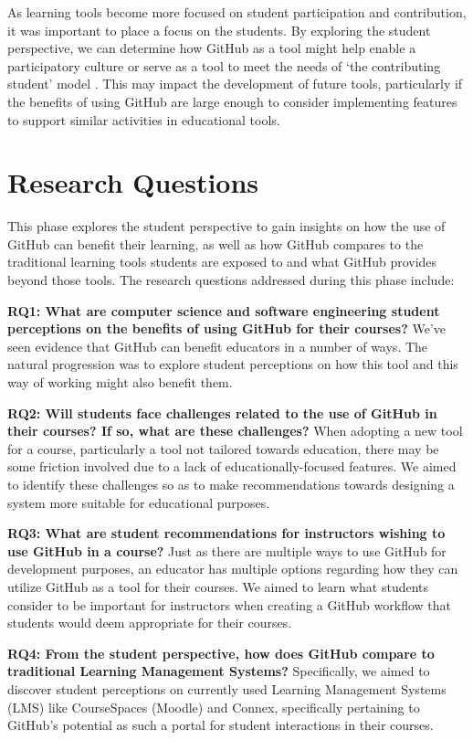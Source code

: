 As learning tools become more focused on student participation and contribution, it was important to place a focus on the students. By exploring the student perspective, we can determine how GitHub as a tool might help enable a participatory culture \cite{jenkins2009confronting} or serve as a tool to meet the needs of `the contributing student' model \cite{hamer2008contributing}. This may impact the development of future tools, particularly if the benefits of using GitHub are large enough to consider implementing features to support similar activities in educational tools.

\section{Research Questions}
This phase explores the student perspective to gain insights on how the use of GitHub can benefit their learning, as well as how GitHub compares to the traditional learning tools students are exposed to and what GitHub provides beyond those tools. The research questions addressed during this phase include:

\bigskip
\textbf{RQ1: What are computer science and software engineering student perceptions on the benefits of using GitHub for their courses?} We've seen evidence that GitHub can benefit educators in a number of ways. The natural progression was to explore student perceptions on how this tool and this way of working might also benefit them.

\bigskip
\textbf{RQ2: Will students face challenges related to the use of GitHub in their courses? If so, what are these challenges?} When adopting a new tool for a course, particularly a tool not tailored towards education, there may be some friction involved due to a lack of educationally-focused features. We aimed to identify these challenges so as to make recommendations towards designing a system more suitable for educational purposes.

\bigskip
\textbf{RQ3: What are student recommendations for instructors wishing to use GitHub in a course?} Just as there are multiple ways to use GitHub for development purposes, an educator has multiple options regarding how they can utilize GitHub as a tool for their courses. We aimed to learn what students consider to be important for instructors when creating a GitHub workflow that students would deem appropriate for their courses.

\bigskip
\textbf{RQ4: From the student perspective, how does GitHub compare to traditional Learning Management Systems?} Specifically, we aimed to discover student perceptions on currently used Learning Management Systems (LMS) like CourseSpaces (Moodle) and Connex, specifically pertaining to GitHub's potential as such a portal for student interactions in their courses.


